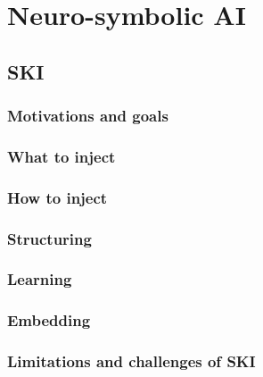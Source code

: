 
\chapter{Neuro-symbolic AI}
\label{ch:nesy-ai}

\section{\Acl{SKI}}\label{sec:ski}

\subsection{Motivations and goals}\label{subsec:ski-motivations-and-goals}

\subsection{What to inject}\label{subsec:what-to-inject}

\subsection{How to inject}\label{subsec:how-to-inject}

\subsection{Structuring}\label{subsec:structuring}

\subsection{Learning}\label{subsec:learning}

\subsection{Embedding}\label{subsec:ski-embedding}

\subsection{Limitations and challenges of \Gls{SKI}}\label{subsec:limitations-and-challenges-of-ski}

\section{}\label{sec:ske}

